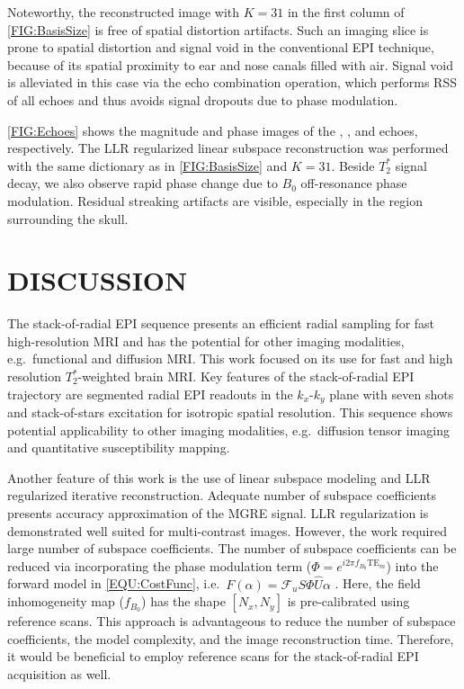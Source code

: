 \documentclass[a4paper,11pt]{article}
\begin{document}
Noteworthy, the reconstructed image with $K = 31$ 
in the first column of \cref{FIG:BasisSize} is free 
of spatial distortion artifacts. 
Such an imaging slice is prone to spatial distortion and signal void 
in the conventional EPI technique, because of its spatial proximity to 
ear and nose canals filled with air. 
Signal void is alleviated in this case via the echo combination operation, 
which performs RSS of all echoes 
and thus avoids signal dropouts due to phase modulation.

\cref{FIG:Echoes} shows the magnitude and phase images 
of the , , and  echoes, respectively. 
The LLR regularized linear subspace reconstruction was performed with 
the same dictionary as in \cref{FIG:BasisSize} and $K = 31$. 
Beside $T_2^*$ signal decay, we also observe rapid phase change 
due to $B_0$ off-resonance phase modulation. 
Residual streaking artifacts are visible, especially in the region 
surrounding the skull.

\section{DISCUSSION}

The stack-of-radial EPI sequence presents an efficient radial sampling 
for fast high-resolution MRI and has the potential for other imaging modalities, 
e.g.~functional and diffusion MRI. 
This work focused on its use for fast and high resolution $T_2^*$-weighted brain MRI. 
Key features of the stack-of-radial EPI trajectory are 
segmented radial EPI readouts in the $k_x$-$k_y$ plane with seven shots 
and stack-of-stars \cite{block_2014_rad} excitation for isotropic spatial resolution.
This sequence shows potential applicability to other imaging modalities, 
e.g.~diffusion tensor imaging and quantitative susceptibility mapping.

Another feature of this work is the use of linear subspace modeling and 
LLR regularized iterative reconstruction. 
Adequate number of subspace coefficients presents accuracy approximation 
of the MGRE signal. LLR regularization is demonstrated well suited for 
multi-contrast images. 
However, the work required large number of subspace coefficients. 
The number of subspace coefficients can be reduced via 
incorporating the phase modulation term ($\Phi = e^{i2\pi f_{B_0} \text{TE}_m}$) 
into the forward model in \cref{EQU:CostFunc}, 
i.e.~$F(\alpha) = \mathcal{F}_u S \Phi \hat{U} \alpha$ 
\cite{dong_2020_epti_sub}. 
Here, the field inhomogeneity map ($f_{B_0}$) has the shape $[N_x, N_y]$
is pre-calibrated using reference scans. 
This approach is advantageous to reduce 
the number of subspace coefficients, the model complexity, 
and the image reconstruction time. 
Therefore, it would be beneficial to employ reference scans 
for the stack-of-radial EPI acquisition as well.
\end{document}
